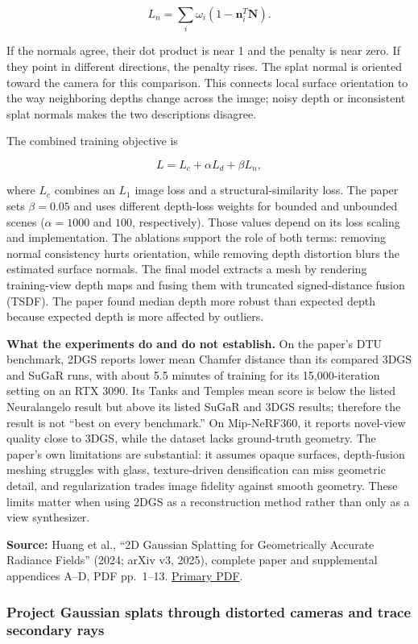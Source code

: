 \[L_n=\sum_i\omega_i(1-\mathbf{n}_i^T\mathbf{N}).\]

If the normals agree, their dot product is near 1 and the penalty is near zero. If they point in different directions, the penalty rises. The splat normal is oriented toward the camera for this comparison. This connects local surface orientation to the way neighboring depths change across the image; noisy depth or inconsistent splat normals makes the two descriptions disagree.

The combined training objective is

\[L=L_c+\alpha L_d+\beta L_n,\]

where \(L_c\) combines an \(L_1\) image loss and a structural-similarity loss. The paper sets \(\beta=0.05\) and uses different depth-loss weights for bounded and unbounded scenes (\(\alpha=1000\) and \(100\), respectively). Those values depend on its loss scaling and implementation. The ablations support the role of both terms: removing normal consistency hurts orientation, while removing depth distortion blurs the estimated surface normals. The final model extracts a mesh by rendering training-view depth maps and fusing them with truncated signed-distance fusion (TSDF). The paper found median depth more robust than expected depth because expected depth is more affected by outliers.

\textbf{What the experiments do and do not establish.} On the paper's DTU benchmark, 2DGS reports lower mean Chamfer distance than its compared 3DGS and SuGaR runs, with about 5.5 minutes of training for its 15,000-iteration setting on an RTX 3090. Its Tanks and Temples mean score is below the listed Neuralangelo result but above its listed SuGaR and 3DGS results; therefore the result is not ``best on every benchmark.'' On Mip-NeRF360, it reports novel-view quality close to 3DGS, while the dataset lacks ground-truth geometry. The paper's own limitations are substantial: it assumes opaque surfaces, depth-fusion meshing struggles with glass, texture-driven densification can miss geometric detail, and regularization trades image fidelity against smooth geometry. These limits matter when using 2DGS as a reconstruction method rather than only as a view synthesizer.

\textbf{Source:} Huang et al., ``2D Gaussian Splatting for Geometrically Accurate Radiance Fields'' (2024; arXiv v3, 2025), complete paper and supplemental appendices A--D, PDF pp.~1--13. \href{https://arxiv.org/pdf/2403.17888}{Primary PDF}.

\subsubsection{Project Gaussian splats through distorted cameras and trace secondary rays}\label{04-visual-computing-ii-ch034-project-gaussian-splats-through-distorted-cameras-and-trace-secondary-rays}

